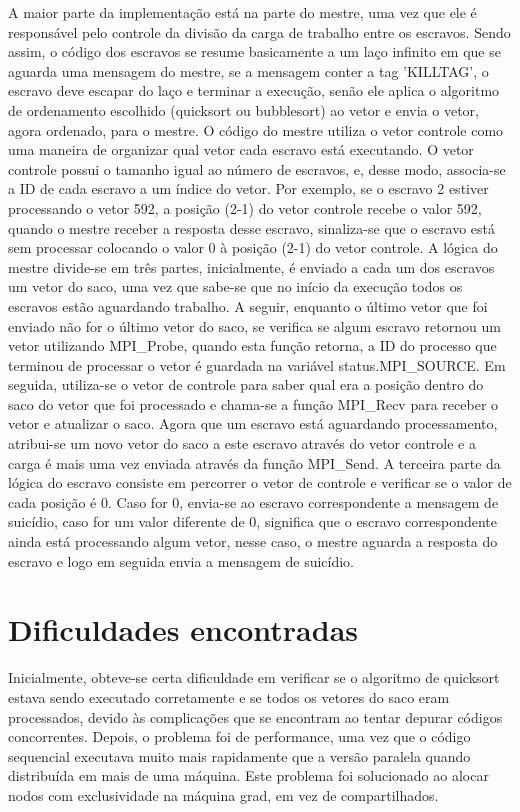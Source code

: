 \documentclass{article}
\begin{document}
\begin{multicols*}{2}
A maior parte da implementação está na parte do mestre, uma vez que ele é responsável pelo controle da divisão da carga de trabalho entre os escravos. Sendo assim, o código dos escravos se resume basicamente a um laço infinito em que se aguarda uma mensagem do mestre, se a mensagem conter a tag 'KILLTAG', o escravo deve escapar do laço e terminar a execução, senão ele aplica o algoritmo de ordenamento escolhido (quicksort ou bubblesort) ao vetor e envia o vetor, agora ordenado, para o mestre. O código do mestre utiliza o vetor controle como uma maneira de organizar qual vetor cada escravo está executando. O vetor controle possui o tamanho igual ao número de escravos, e, desse modo, associa-se a ID de cada escravo a um índice do vetor. Por exemplo, se o escravo 2 estiver processando o vetor 592, a posição (2-1) do vetor controle recebe o valor 592, quando o mestre receber a resposta desse escravo, sinaliza-se que o escravo está sem processar colocando o valor 0 à posição (2-1) do vetor controle. A lógica do mestre divide-se em três partes, inicialmente, é enviado a cada um dos escravos um vetor do saco, uma vez que sabe-se que no início da execução todos os escravos estão aguardando trabalho. A seguir, enquanto o último vetor que foi enviado não for o último vetor do saco, se verifica se algum escravo retornou um vetor utilizando MPI\_Probe, quando esta função retorna, a ID do processo que terminou de processar o vetor é guardada na variável status.MPI\_SOURCE. Em seguida, utiliza-se o vetor de controle para saber qual era a posição dentro do saco do vetor que foi processado e chama-se a função MPI\_Recv para receber o vetor e atualizar o saco. Agora que um escravo está aguardando processamento, atribui-se um novo vetor do saco a este escravo através do vetor controle e a carga é mais uma vez enviada através da função MPI\_Send. A terceira parte da lógica do escravo consiste em percorrer o vetor de controle e verificar se o valor de cada posição é 0. Caso for 0, envia-se ao escravo correspondente a mensagem de suicídio, caso for um valor diferente de 0, significa que o escravo correspondente ainda está processando algum vetor, nesse caso, o mestre aguarda a resposta do escravo e logo em seguida envia a mensagem de suicídio.

\section{Dificuldades encontradas}
Inicialmente, obteve-se certa dificuldade em verificar se o algoritmo de quicksort estava sendo executado corretamente e se todos os vetores do saco eram processados, devido às complicações que se encontram ao tentar depurar códigos concorrentes. Depois, o problema foi de performance, uma vez que o código sequencial executava muito mais rapidamente que a versão paralela quando distribuída em mais de uma máquina. Este problema foi solucionado ao alocar nodos com exclusividade na máquina grad, em vez de compartilhados.


\end{multicols*}
\end{document}
